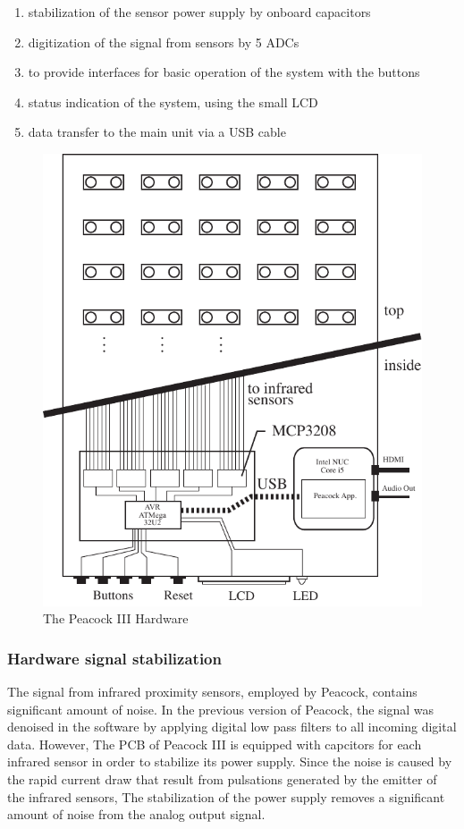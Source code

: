 \documentclass{nime-alternate}
\begin{document}
\begin{enumerate}
       \item stabilization of the sensor power supply by onboard capacitors
       \item digitization of the signal from sensors by 5 ADCs
       \item to provide interfaces for basic operation of the system with the buttons
       \item status indication of the system, using the small LCD
       \item data transfer to the main unit via a USB cable
\end{enumerate}

\begin{figure}[htbp]
       \begin{center}
              \includegraphics[width=0.9\columnwidth]{Peacock_hardware.pdf}
       \end{center}
       \caption{The Peacock III Hardware}
       \label{fig:peacock}
\end{figure}

\subsubsection{Hardware signal stabilization} %
The signal from infrared proximity sensors, employed by Peacock, contains significant amount of noise. In the previous version of Peacock, the signal was denoised in the software by applying digital low pass filters to all incoming digital data. However, The PCB of Peacock III is equipped with capcitors for each infrared sensor in order to stabilize its power supply. Since the noise is caused by the rapid current draw that result from pulsations generated by the emitter of the infrared sensors, The stabilization of the power supply removes a significant amount of noise from the analog output signal.
\end{document}
